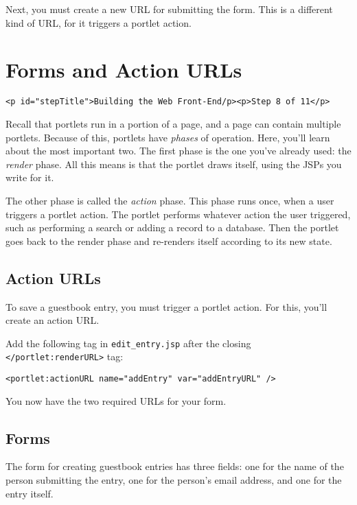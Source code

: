 Next, you must create a new URL for submitting the form. This is a
different kind of URL, for it triggers a portlet action.

\chapter{Forms and Action URLs}\label{forms-and-action-urls}

\begin{verbatim}
<p id="stepTitle">Building the Web Front-End/p><p>Step 8 of 11</p>
\end{verbatim}

Recall that portlets run in a portion of a page, and a page can contain
multiple portlets. Because of this, portlets have \emph{phases} of
operation. Here, you'll learn about the most important two. The first
phase is the one you've already used: the \emph{render} phase. All this
means is that the portlet draws itself, using the JSPs you write for it.

The other phase is called the \emph{action} phase. This phase runs once,
when a user triggers a portlet action. The portlet performs whatever
action the user triggered, such as performing a search or adding a
record to a database. Then the portlet goes back to the render phase and
re-renders itself according to its new state.

\section{Action URLs}\label{action-urls}

To save a guestbook entry, you must trigger a portlet action. For this,
you'll create an action URL.

Add the following tag in \texttt{edit\_entry.jsp} after the closing
\texttt{\textless{}/portlet:renderURL\textgreater{}} tag:

\begin{verbatim}
<portlet:actionURL name="addEntry" var="addEntryURL" />
\end{verbatim}

You now have the two required URLs for your form.

\section{Forms}\label{forms}

The form for creating guestbook entries has three fields: one for the
name of the person submitting the entry, one for the person's email
address, and one for the entry itself.

